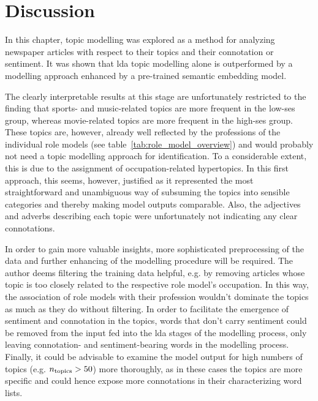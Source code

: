 \section{Discussion}
In this chapter, topic modelling was explored as a method for analyzing newspaper articles with respect to their topics and their connotation or sentiment. It was shown that \gls{lda} topic modelling alone is outperformed by a modelling approach enhanced by a pre-trained semantic embedding model.

The clearly interpretable results at this stage are unfortunately restricted to the  finding that sports- and music-related topics are more frequent in the low-\gls{ses} group, whereas movie-related topics are more frequent in the high-\gls{ses} group. These topics are, however, already well reflected by the professions of the individual role models (see table~\ref{tab:role_model_overview}) and would probably not need a topic modelling approach for identification. To a considerable extent, this is due to the assignment of occupation-related hypertopics. In this first approach, this seems, however, justified as it represented the most straightforward and unambiguous way of subsuming the topics into sensible categories and thereby making model outputs comparable. Also, the adjectives and adverbs describing each topic were unfortunately not indicating any clear connotations.

In order to gain more valuable insights, more sophisticated preprocessing of the data and further enhancing of the modelling procedure will be required. The author deems filtering the training data helpful, e.g. by removing articles whose topic is too closely related to the respective role model's occupation. In this way, the association of role models with their profession wouldn't dominate the topics as much as they do without filtering. In order to facilitate the emergence of sentiment and connotation in the topics, words that don't carry sentiment could be removed from the input fed into the \gls{lda} stages of the modelling process, only leaving connotation- and  sentiment-bearing words in the modelling process. Finally, it could be advisable to examine the model output for high numbers of topics (e.g. $n_\text{topics}>50$) more thoroughly, as in these cases the topics are more specific and could hence expose more connotations in their characterizing word lists.